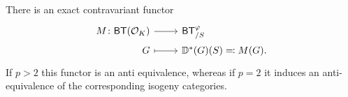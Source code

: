 \begin{prop}\label{prop:A6Kisin}
	There is an exact contravariant functor
	\begin{equation*}
	\begin{tikzcd}[row sep = 0ex
		,/tikz/column 1/.append style={anchor=base east}
		,/tikz/column 2/.append style={anchor=base west}]
		M\colon \mathsf{BT}(\mathcal{O}_{ K }) \arrow[r, "", rightarrow] &
		\mathsf{BT}^{\varphi}_{/S} \\
		G \arrow[r, "", mapsto] & 
		\mathbb{D}^*(G)(S) \eqqcolon M(G)
	.\end{tikzcd}
	\end{equation*} 
	If $p > 2$ this functor is an anti equivalence,
	whereas if $p = 2$ it induces an anti-equivalence of the 
	corresponding isogeny categories.
\end{prop}
